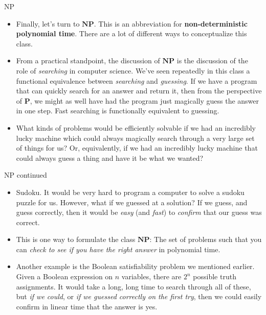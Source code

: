 \documentclass{beamer}
\begin{document}
\begin{frame}{NP}
    \begin{itemize}
        \item Finally, let's turn to $\mathbf{NP}$. This is an abbreviation for \textbf{non-deterministic polynomial time}. There are a lot of different ways to conceptualize this class. 
        \item From a practical standpoint, the discussion of $\mathbf{NP}$ is the discussion of the role of \emph{searching} in computer science. We've seen repeatedly in this class a functional equivalence between \emph{searching} and \emph{guessing}. If we have a program that can quickly search for an answer and return it, then from the perspective of $\mathbf{P}$, we might as well have had the program just magically guess the answer in one step. Fast searching is functionally equivalent to guessing. 
        \item What kinds of problems would be efficiently solvable if we had an incredibly lucky machine which could always magically search through a very large set of things for us? Or, equivalently, if we had an incredibly lucky machine that could always guess a thing and have it be what we wanted?
    \end{itemize}
\end{frame}

\begin{frame}{NP continued}
    \begin{itemize}
        \item Sudoku. It would be very hard to program a computer to solve a sudoku puzzle for us. However, what if we guessed at a solution? If we guess, and guess correctly, then it would be \emph{easy} (and \emph{fast}) to \emph{confirm} that our guess was correct. \pause 
        \item This is one way to formulate the class $\mathbf{NP}$: The set of problems such that you can \emph{check to see if you have the right answer} in polynomial time. 
        \item Another example is the Boolean satisfiability problem we mentioned earlier. Given a Boolean expression on $n$ variables, there are $2^n$ possible truth assignments. It would take a long, long time to search through all of these, but \emph{if we could}, or \emph{if we guessed correctly on the first try}, then we could easily confirm in linear time that the answer is yes. 
    \end{itemize}
\end{frame}
\end{document}
